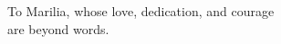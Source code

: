 \chapter*{}
\begin{center}
    \thispagestyle{empty}
    \vspace*{\fill}
    To Marilia, whose love, dedication, and courage \\
    are beyond words.
    \vspace*{\fill}
\end{center}
\cleardoublepage
